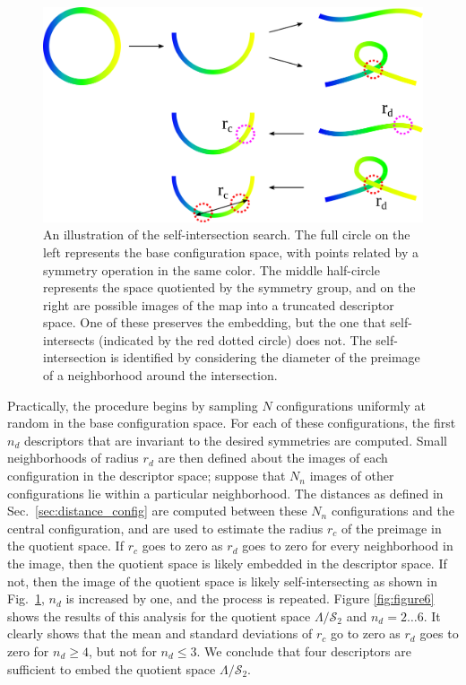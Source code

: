 \documentclass[default,iicol]{sn-jnl}%
\theoremstyle{thmstyleone}%
\theoremstyle{thmstyletwo}%
\theoremstyle{thmstylethree}%
\begin{document}
\begin{figure}
	\centering
	\includegraphics[width=0.7\columnwidth]{figure5.png}
	\caption{An illustration of the self-intersection search. The full circle on the left represents the base configuration space, with points related by a symmetry operation in the same color. The middle half-circle represents the space quotiented by the symmetry group, and on the right are possible images of the map into a truncated descriptor space. One of these preserves the embedding, but the one that self-intersects (indicated by the red dotted circle) does not. The self-intersection is identified by considering the diameter of the preimage of a neighborhood around the intersection.}
	\label{fig:figure5}
\end{figure}	

Practically, the procedure begins by sampling $N$ configurations uniformly at random in the base configuration space. For each of these configurations, the first $n_d$ descriptors that are invariant to the desired symmetries are computed. Small neighborhoods of radius $r_d$ are then defined about the images of each configuration in the descriptor space; suppose that $N_n$ images of other configurations lie within a particular neighborhood. The distances as defined in Sec.\ \ref{sec:distance_config} are computed between these $N_n$ configurations and the central configuration, and are used to estimate the radius $r_c$ of the preimage in the quotient space. If $r_c$ goes to zero as $r_d$ goes to zero for every neighborhood in the image, then the quotient space is likely embedded in the descriptor space. If not, then the image of the quotient space is likely self-intersecting as shown in Fig.\ \ref{fig:figure5}, $n_d$ is increased by one, and the process is repeated. Figure \ref{fig:figure6} shows the results of this analysis for the quotient space $\Lambda/\mathcal{S}_2$ and $n_d = 2 \dots 6$. It clearly shows that the mean and standard deviations of $r_c$ go to zero as $r_d$ goes to zero for $n_d \geq 4$, but not for $n_d \leq 3$. We conclude that four descriptors are sufficient to embed the quotient space $\Lambda/\mathcal{S}_2$.
\end{document}
